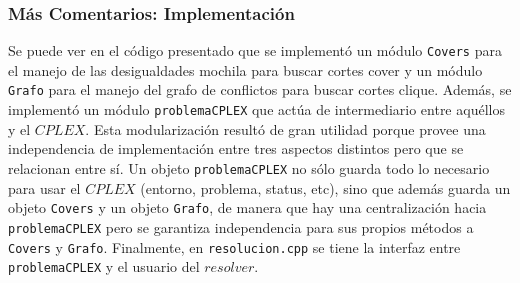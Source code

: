 \subsubsection{Más Comentarios: Implementación}

Se puede ver en el código presentado que se implementó un módulo \verb_Covers_ para el manejo de las desigualdades mochila para buscar cortes cover y un módulo \verb_Grafo_ para el manejo del grafo de conflictos para buscar cortes clique. Además, se implementó un módulo \verb_problemaCPLEX_ que actúa de intermediario entre aquéllos y el $CPLEX$. Esta modularización resultó de gran utilidad porque provee una independencia de implementación entre tres aspectos distintos pero que se relacionan entre sí. Un objeto \verb_problemaCPLEX_ no sólo guarda todo lo necesario para usar el $CPLEX$ (entorno, problema, status, etc), sino que además guarda un objeto \verb_Covers_ y un objeto \verb_Grafo_, de manera que hay una centralización hacia \verb_problemaCPLEX_ pero se garantiza independencia para sus propios métodos a \verb_Covers_ y \verb_Grafo_. Finalmente, en \verb_resolucion.cpp_ se tiene la interfaz entre \verb_problemaCPLEX_ y el usuario del $resolver$.\\
